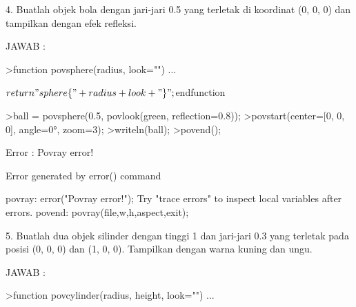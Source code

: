 \documentclass{article}
\begin{document}
\begin{eulernotebook}
\begin{eulercomment}
\begin{eulercomment}
\begin{eulercomment}
\begin{eulercomment}
\begin{eulercomment}
\begin{eulercomment}
\begin{eulercomment}
\begin{eulercomment}
\begin{eulercomment}
\begin{eulercomment}
\begin{eulercomment}
\begin{eulercomment}
\begin{eulercomment}
\begin{eulercomment}
\begin{eulercomment}
\begin{eulercomment}
\begin{eulercomment}
\begin{eulercomment}
\begin{eulercomment}
\begin{eulercomment}
\begin{eulercomment}
\begin{eulercomment}
\begin{eulercomment}
\begin{eulercomment}
\begin{eulercomment}
\begin{eulercomment}
\begin{eulercomment}
\begin{eulercomment}
\begin{eulercomment}
\begin{eulercomment}
\begin{eulercomment}
4. Buatlah objek bola dengan jari-jari 0.5 yang terletak di koordinat
(0, 0, 0) dan tampilkan dengan efek refleksi.

JAWAB :
\end{eulercomment}
\begin{eulerprompt}
>function povsphere(radius, look="") ...
\end{eulerprompt}
\begin{eulerudf}
  $  return "sphere \{" + radius + look + "\}";
  $endfunction
\end{eulerudf}
\begin{eulerprompt}
>ball = povsphere(0.5, povlook(green, reflection=0.8));
>povstart(center=[0, 0, 0], angle=0°, zoom=3);
>writeln(ball); 
>povend();
\end{eulerprompt}
\begin{euleroutput}
  Error : Povray error!
  
  Error generated by error() command
  
  povray:
      error("Povray error!");
  Try "trace errors" to inspect local variables after errors.
  povend:
      povray(file,w,h,aspect,exit); 
\end{euleroutput}
\begin{eulercomment}
5. Buatlah dua objek silinder dengan tinggi 1 dan jari-jari 0.3 yang
terletak pada posisi (0, 0, 0) dan (1, 0, 0). Tampilkan dengan warna
kuning dan ungu.

JAWAB :
\end{eulercomment}
\begin{eulerprompt}
>function povcylinder(radius, height, look="") ...
\end{eulerprompt}
\begin{eulerudf}
  

\end{eulerudf}
\end{eulercomment}
\end{eulercomment}
\end{eulercomment}
\end{eulercomment}
\end{eulercomment}
\end{eulercomment}
\end{eulercomment}
\end{eulercomment}
\end{eulercomment}
\end{eulercomment}
\end{eulercomment}
\end{eulercomment}
\end{eulercomment}
\end{eulercomment}
\end{eulercomment}
\end{eulercomment}
\end{eulercomment}
\end{eulercomment}
\end{eulercomment}
\end{eulercomment}
\end{eulercomment}
\end{eulercomment}
\end{eulercomment}
\end{eulercomment}
\end{eulercomment}
\end{eulercomment}
\end{eulercomment}
\end{eulercomment}
\end{eulercomment}
\end{eulercomment}
\end{eulernotebook}
\end{document}
